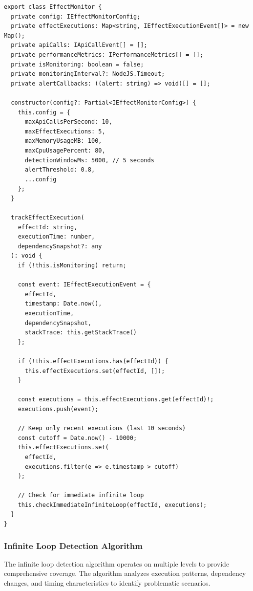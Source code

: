 \documentclass[10pt]{article}
\begin{document}
\begin{lstlisting}[caption={Effect Monitor Core Implementation}]
export class EffectMonitor {
  private config: IEffectMonitorConfig;
  private effectExecutions: Map<string, IEffectExecutionEvent[]> = new Map();
  private apiCalls: IApiCallEvent[] = [];
  private performanceMetrics: IPerformanceMetrics[] = [];
  private isMonitoring: boolean = false;
  private monitoringInterval?: NodeJS.Timeout;
  private alertCallbacks: ((alert: string) => void)[] = [];

  constructor(config?: Partial<IEffectMonitorConfig>) {
    this.config = {
      maxApiCallsPerSecond: 10,
      maxEffectExecutions: 5,
      maxMemoryUsageMB: 100,
      maxCpuUsagePercent: 80,
      detectionWindowMs: 5000, // 5 seconds
      alertThreshold: 0.8,
      ...config
    };
  }

  trackEffectExecution(
    effectId: string,
    executionTime: number,
    dependencySnapshot?: any
  ): void {
    if (!this.isMonitoring) return;

    const event: IEffectExecutionEvent = {
      effectId,
      timestamp: Date.now(),
      executionTime,
      dependencySnapshot,
      stackTrace: this.getStackTrace()
    };

    if (!this.effectExecutions.has(effectId)) {
      this.effectExecutions.set(effectId, []);
    }

    const executions = this.effectExecutions.get(effectId)!;
    executions.push(event);

    // Keep only recent executions (last 10 seconds)
    const cutoff = Date.now() - 10000;
    this.effectExecutions.set(
      effectId,
      executions.filter(e => e.timestamp > cutoff)
    );

    // Check for immediate infinite loop
    this.checkImmediateInfiniteLoop(effectId, executions);
  }
}
\end{lstlisting}

\subsubsection{Infinite Loop Detection Algorithm}

The infinite loop detection algorithm operates on multiple levels to provide comprehensive coverage. The algorithm analyzes execution patterns, dependency changes, and timing characteristics to identify problematic scenarios.
\end{document}
